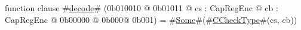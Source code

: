 function clause #\hyperref[sailMIPSzdecode]{decode}# (0b010010 @ 0b01011 @ cs : CapRegEnc @ cb : CapRegEnc @ 0b00000 @ 0b000@ 0b001) = #\hyperref[sailMIPSzSome]{Some}#(#\hyperref[sailMIPSzCCheckType]{CCheckType}#(cs, cb))
